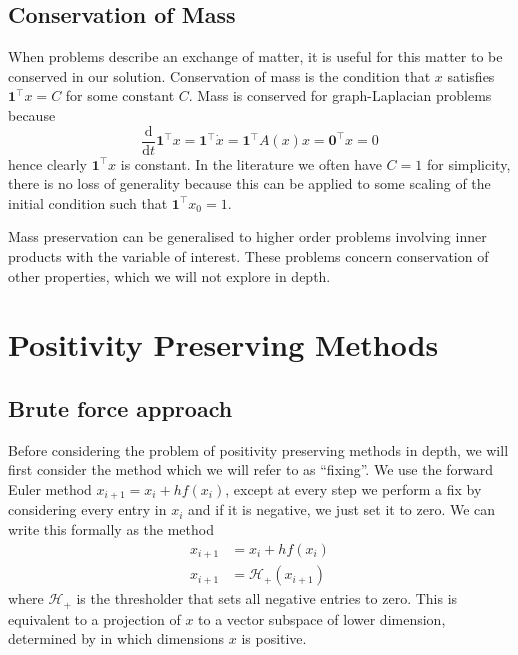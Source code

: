 \subsection{Conservation of Mass}


When problems describe an exchange of matter, it is useful for this matter to be conserved in our solution.
Conservation of mass is the condition that $x$ satisfies $\mathbf{1}^\top x = C$ for some constant $C$.
Mass is conserved for graph-Laplacian problems because
\begin{equation*}
    \frac{\mathrm{d}}{\mathrm{d}t}\mathbf{1}^\top x = \mathbf{1}^\top \dot{x} = \mathbf{1}^\top A(x)x = \mathbf{0}^\top x = 0
\end{equation*}
hence clearly $\mathbf{1}^\top x$ is constant.
In the literature we often have $C=1$ for simplicity,
there is no loss of generality because this can be applied to some scaling of the initial condition such that $\mathbf{1}^\top x_0 = 1$.

Mass preservation can be generalised to higher order problems involving inner products with the variable of interest.
These problems concern conservation of other properties, which we will not explore in depth.

\section{Positivity Preserving Methods}

\subsection{Brute force approach}

Before considering the problem of positivity preserving methods in depth, we will first consider the method which we will refer to as ``fixing''.
We use the forward Euler method $x_{i+1} = x_i + hf(x_i)$, except at every step we perform a fix by considering every entry in $x_i$ and if it is negative, we just set it to zero.
We can write this formally as the method
\begin{align*}
    x_{i+1} &= x_i + h f(x_i) \\
    x_{i+1} &= \mathcal{H}_+(x_{i+1}) 
\end{align*}
where $\mathcal{H}_+$ is the thresholder that sets all negative entries to zero.
This is equivalent to a projection of $x$ to a vector subspace of lower dimension, determined by in which dimensions $x$ is positive.

